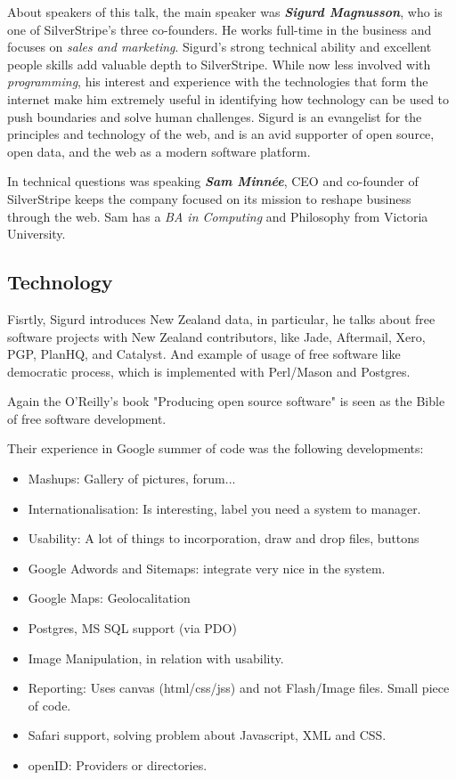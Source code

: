 \documentclass[11pt]{article}
\begin{document}
About speakers of this talk, the main speaker was \emph{\textbf{Sigurd Magnusson}}, who is one of SilverStripe’s three co-founders. He works full-time in the business and focuses on \emph{sales and marketing}.  Sigurd's strong technical ability and excellent people skills add valuable depth to SilverStripe. While now less involved with \emph{programming}, his interest and experience with the technologies that form the internet make him extremely useful in identifying how technology can be used to push boundaries and solve human challenges. Sigurd is an evangelist for the principles and technology of the web, and is an avid supporter of open source, open data, and the web as a modern software platform.

In technical questions was speaking\emph{ \textbf{Sam Minnée}}, CEO and co-founder of SilverStripe keeps the company focused on its mission to reshape business through the web. Sam has a \emph{BA in Computing} and Philosophy from Victoria University.

\subsection{Technology}
Fisrtly, Sigurd introduces New Zealand data, in particular, he talks about free software projects with New Zealand contributors, like Jade, Aftermail, Xero, PGP, PlanHQ, and Catalyst. And example of usage of free software like democratic process, which is implemented with Perl/Mason and Postgres. 

Again the O'Reilly's book "Producing open source software" is seen as the Bible of free software development.

Their experience in Google summer of code was the following developments:
\begin{itemize}
  \item Mashups: Gallery of pictures, forum...
  \item Internationalisation: Is interesting, label you need a system to manager.
  \item Usability: A lot of things to incorporation, draw and drop files, buttons
  \item Google Adwords and Sitemaps: integrate very nice in the system.
  \item Google Maps: Geolocalitation
  \item Postgres, MS SQL support (via PDO)
  \item Image Manipulation, in relation with usability.
  \item Reporting: Uses canvas (html/css/jss) and not Flash/Image files. Small piece of code.
  \item Safari support, solving problem about Javascript, XML and CSS.
  \item openID: Providers or directories.
\end{itemize}
\end{document}
